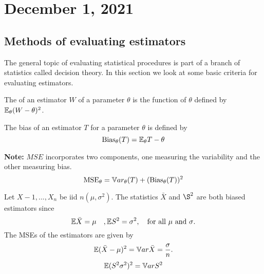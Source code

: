 \section{December 1, 2021}
\subsection{Methods of evaluating estimators}
The general topic of evaluating statistical procedures is part of a branch of statistics called decision theory. In this section we look at some basic criteria for evaluating estimators.
    
\begin{definition}
    The  of an estimator $W$ of a parameter $\theta$ is the function of $\theta$ defined by $\mathbb E_{\theta}(W-\theta)^2$.
\end{definition}

\begin{definition}[Bias]
    The bias of an estimator $T$ for a parameter $\theta$ is defined by 
    $$
    \text{Bias}_{\theta}(T) = \mathbb E_{\theta}T -\theta
    $$
\end{definition}
\textbf{Note:} $MSE$ incorporates two components, one measuring the variability and the other measuring bias.
$$
\text{MSE}_{\theta} = \mathbb V ar_{\theta}(T) + (\text{Bias}_{\theta}(T))^2
$$
\begin{example}
    Let $X-1,...,X_n$ be iid $n(\mu,\sigma^2)$. The statistics $\bar{X}$ and $\S^2$ are both biased estimators since
    $$
    \mathbb E \bar{X} = \mu \quad, \mathbb E S^2 = \sigma^2, \quad \text{for all $\mu$ and $\sigma$}.
    $$
    The MSEs of the estimators are given by
    $$
    \mathbb E(\bar{X} - \mu)^2 = \mathbb V ar \bar{X} = \frac{\sigma}{n}.
    $$
    $$
    \mathbb E(S^2 \sigma^2)^2 = \mathbb V ar S^2
    $$
\end{example}
